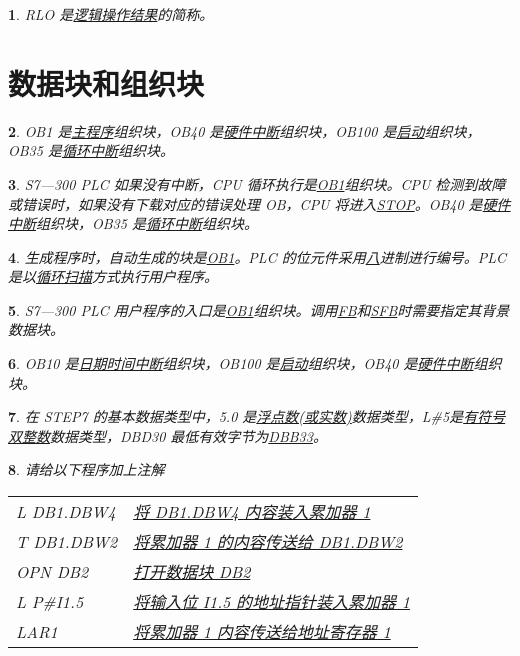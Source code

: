 \documentclass{ctexart}
\theoremstyle{change}
\newtheorem{ti}{}[section]
\begin{document}
\begin{ti}
	RLO 是\uline{逻辑操作结果}的简称。
\end{ti}

\section{数据块和组织块}

\begin{ti}
	OB1 是\uline{主程序}组织块，OB40 是\uline{硬件中断}组织块，OB100 是\uline{启动}组织块，OB35 是\uline{循环中断}组织块。
\end{ti}

\begin{ti}
	S7---300 PLC 如果没有中断，CPU 循环执行是\uline{OB1}组织块。CPU 检测到故障或错误时，如果没有下载对应的错误处理 OB，CPU 将进入\uline{STOP}。OB40 是\uline{硬件中断}组织块，OB35 是\uline{循环中断}组织块。
\end{ti}

\begin{ti}
	生成程序时，自动生成的块是\uline{OB1}。PLC 的位元件采用\uline{八}进制进行编号。PLC 是以\uline{循环扫描}方式执行用户程序。
\end{ti}

\begin{ti}
	S7---300 PLC 用户程序的入口是\uline{OB1}组织块。调用\uline{FB}和\uline{SFB}时需要指定其背景数据块。
\end{ti}

\begin{ti}
	OB10 是\uline{日期时间中断}组织块，OB100 是\uline{启动}组织块，OB40 是\uline{硬件中断}组织块。
\end{ti}

\begin{ti}
	在 STEP7 的基本数据类型中，5.0 是\uline{浮点数(或实数)}数据类型，L\#5是\uline{有符号双整数}数据类型，DBD30 最低有效字节为\uline{DBB33}。
\end{ti}

\begin{ti}
	请给以下程序加上注解
	\begin{center}
		\begin{tabular}{l@{\hspace{2pc}//}l}
			L DB1.DBW4 & \uline{将 DB1.DBW4 内容装入累加器 1}\\
			T DB1.DBW2 & \uline{将累加器 1 的内容传送给 DB1.DBW2}\\
			OPN DB2 & \uline{打开数据块 DB2}\\
			L P\#I1.5 & \uline{将输入位 I1.5 的地址指针装入累加器 1}\\
			LAR1 & \uline{将累加器 1 内容传送给地址寄存器 1}
		\end{tabular}
	\end{center}
\end{ti}
\end{document}
